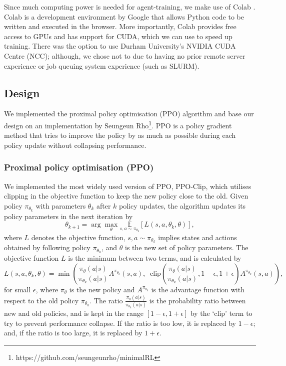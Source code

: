 \documentclass[12pt,a4paper]{article}
\begin{document}
Since much computing power is needed for agent-training, we make use of Colab \cite{Bisong2019}. Colab is a development environment by Google that allows Python code to be written and executed in the browser. More importantly, Colab provides free access to GPUs and has support for CUDA, which we can use to speed up training. There was the option to use Durham University's NVIDIA CUDA Centre (NCC); although, we chose not to due to having no prior remote server experience or job queuing system experience (such as SLURM).

\subsection{Design}
We implemented the proximal policy optimisation (PPO) algorithm \cite{DBLP:journals/corr/SchulmanWDRK17} and base our design on an implementation by Seungeun Rho\footnote{https://github.com/seungeunrho/minimalRL}. PPO is a policy gradient method that tries to improve the policy by as much as possible during each policy update without collapsing performance. 

\subsubsection{Proximal policy optimisation (PPO)}
We implemented the most widely used version of PPO, PPO-Clip, which utilises clipping in the objective function to keep the new policy close to the old. Given policy $\pi_{\theta_{k}}$ with parameters $\theta_k$ after $k$ policy updates, the algorithm updates its policy parameters in the next iteration by \[\theta_{k+1} = \arg \max_{\theta} \underset{s,a \sim \pi_{\theta_k}}{\mathbb{E}}\left[L(s,a,\theta_k, \theta)\right],\] where $L$ denotes the objective function, $s,a \sim \pi_{\theta_k}$ implies states and actions obtained by following policy $\pi_{\theta_{k}}$, and $\theta$ is the new set of policy parameters. The objective function $L$ is the minimum between two terms, and is calculated by \[L(s,a,\theta_k,\theta) = \min\left(\frac{\pi_{\theta}(a|s)}{\pi_{\theta_k}(a|s)}  A^{\pi_{\theta_k}}(s,a), \;\;\text{clip}\left(\frac{\pi_{\theta}(a|s)}{\pi_{\theta_k}(a|s)}, 1 - \epsilon, 1+\epsilon \right) A^{\pi_{\theta_k}}(s,a) \right),\] for small $\epsilon$, where $\pi_{\theta}$ is the new policy and $A^{\pi_{\theta_k}}$ is the advantage function with respect to the old policy $\pi_{\theta_{k}}$. The ratio $\frac{\pi_{\theta}(a|s)}{\pi_{\theta_k}(a|s)}$ is the probability ratio between new and old policies, and is kept in the range $\left[1 - \epsilon, 1 + \epsilon \right]$ by the `clip' term to try to prevent performance collapse. If the ratio is too low, it is replaced by $1 - \epsilon$; and, if the ratio is too large, it is replaced by $1 + \epsilon$. 
\end{document}
